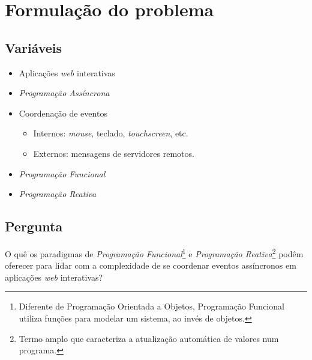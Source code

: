 \section{Formulação do problema}\label{lproblema}

\subsection{Variáveis}

\begin{itemize}[noitemsep]
  \item Aplicações \textit{web} interativas
  \item \textit{Programação Assíncrona}
  \item Coordenação de eventos
    \begin{itemize}[noitemsep]
      \item Internos: \textit{mouse}, teclado, \textit{touchscreen}, etc.
      \item Externos: mensagens de servidores remotos.
    \end{itemize}
  \item \textit{Programação Funcional}
  \item \textit{Programação Reativa}
\end{itemize}


\subsection{Pergunta}

O quê os paradigmas de \textit{Programação Funcional}\footnote{
  Diferente de Programação Orientada a Objetos,
  Programação Funcional utiliza funções para modelar um sistema,
  ao invés de objetos.
}
e \textit{Programação Reativa}\footnote{
  Termo amplo que caracteriza a atualização automática de valores
  num programa.
}
podêm oferecer para lidar com a complexidade de se coordenar
eventos assíncronos em aplicações \textit{web} interativas?

